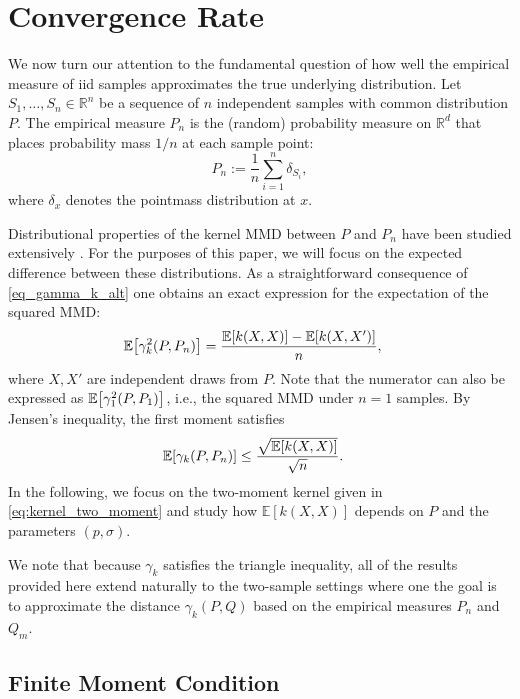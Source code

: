 \documentclass{article}
\theoremstyle{definition}
\newcommand{\reals}{\mathbb{R}}
\newcommand{\bEx}{\ensuremath{\mathbb{E}}}
\newcommand{\ex}[1]{\ensuremath{\mathbb{E}\left[ #1\right]}}
\let\originalleft\left
\let\originalright\right
\renewcommand{\left}{\mathopen{}\mathclose\bgroup\originalleft}
\renewcommand{\right}{\aftergroup\egroup\originalright}
\begin{document}
\section{Convergence Rate}\label{sec:convergence}

We now turn our attention to the fundamental question of how well the empirical measure of iid samples approximates the true underlying distribution. Let $S_1, \dots, S_n \in\reals^n$ be a sequence of $n$ independent samples with common distribution $P$. The empirical measure $P_n$ is the (random) probability measure on $\reals^d$ that places probability  mass $1/n$ at each sample point:
\begin{equation}\label{eq:def-Pn}
P_n := \frac{1}{n} \sum_{i=1}^n \delta_{S_i},
\end{equation}
where $\delta_x$ denotes the pointmass distribution at $x$. 

Distributional properties of the kernel MMD between $P$ and $P_n$ have been studied extensively \cite{gretton2012kernel}. For the purposes of this paper, we will focus on the expected difference between these distributions. As a straightforward consequence of  \eqref{eq_gamma_k_alt} one obtains an exact expression for the expectation of the squared MMD: 
\begin{align}
  \bEx\left[ \gamma^2_k(P, P_n)  \right] & =\frac{\bEx[k(X, X)]  - \bEx[k(X, X')]}{n}, \label{eq:gamma_k_moment}
\end{align}
where $X,X'$ are independent draws from $P$. Note that the numerator can also be expressed as $\ex{ \gamma_1^2(P, P_1)}$, i.e., the squared MMD under $n=1$ samples. By Jensen's inequality, the first moment satisfies 
\begin{align}
  \bEx\left[ \gamma_k(P, P_n)  \right] &\le \frac{\sqrt{\bEx[k(X, X)]}}{\sqrt{n}}. \label{eq:gamma_k_first_moment}
\end{align}
In the following, we focus on the two-moment kernel given in \eqref{eq:kernel_two_moment} and study how $\bEx[k(X, X)]$ depends on $P$ and the parameters $(p,\sigma)$.
 

We note that because $\gamma_k$ satisfies the triangle inequality, all of the results provided here extend naturally to the two-sample settings where one the goal is to approximate the distance $\gamma_k(P,Q)$ based on the empirical measures $P_n$ and $Q_m$.


\subsection{Finite Moment Condition} \label{sec_kxx}
\end{document}
